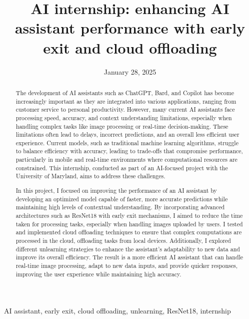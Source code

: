 ﻿\documentclass[12pt,conference,onecolumn]{IEEEtran}
\title{AI internship: enhancing AI assistant performance with early exit and cloud offloading}
\author{\IEEEauthorblockN{Dilan Gandhi}\IEEEauthorblockA{Science \& Engineering\\Manalapan High School\\Englishtown, NJ\\525dgandhi@frhsd.com}}
\date{January 28, 2025}
\newcommand{\keywords}{AI assistant, early exit, cloud offloading, unlearning, ResNet18, internship}
\begin{document}
\maketitle 

\begin{abstract}
The development of AI assistants such as ChatGPT, Bard, and Copilot has become increasingly important as they are integrated into various applications, ranging from customer service to personal productivity. However, many current AI assistants face processing speed, accuracy, and context understanding limitations, especially when handling complex tasks like image processing or real-time decision-making. These limitations often lead to delays, incorrect predictions, and an overall less efficient user experience. Current models, such as traditional machine learning algorithms, struggle to balance efficiency with accuracy, leading to trade-offs that compromise performance, particularly in mobile and real-time environments where computational resources are constrained. This internship, conducted as part of an AI-focused project with the University of Maryland, aims to address these challenges.

In this project, I focused on improving the performance of an AI assistant by developing an optimized model capable of faster, more accurate predictions while maintaining high levels of contextual understanding. By incorporating advanced architectures such as ResNet18 with early exit mechanisms, I aimed to reduce the time taken for processing tasks, especially when handling images uploaded by users. I tested and implemented cloud offloading techniques to ensure that complex computations are processed in the cloud, offloading tasks from local devices. Additionally, I explored different unlearning strategies to enhance the assistant's adaptability to new data and improve its overall efficiency. The result is a more efficient AI assistant that can handle real-time image processing, adapt to new data inputs, and provide quicker responses, improving the user experience while maintaining high accuracy.
\end{abstract}

\begin{IEEEkeywords}
\keywords
\end{IEEEkeywords}
\end{document}

